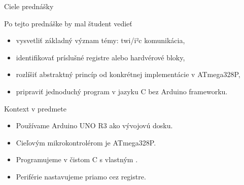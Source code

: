
\begin{frame}{Ciele prednášky}
\begin{tukebox}{Po tejto prednáške by mal študent vedieť}
\begin{itemize}
    \item vysvetliť základný význam témy: twi/i²c komunikácia,
    \item identifikovať príslušné registre alebo hardvérové bloky,
    \item rozlíšiť abstraktný princíp od konkrétnej implementácie v ATmega328P,
    \item pripraviť jednoduchý program v jazyku C bez Arduino frameworku.
\end{itemize}
\end{tukebox}
\end{frame}

\begin{frame}{Kontext v predmete}
\begin{itemize}
    \item Používame Arduino UNO R3 ako vývojovú dosku.
    \item Cieľovým mikrokontrolérom je ATmega328P.
    \item Programujeme v čistom C s vlastným .
    \item Periférie nastavujeme priamo cez registre.
\end{itemize}
\end{frame}
